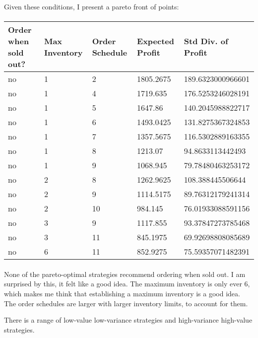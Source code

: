 \documentclass{article}
\begin{document}
Given these conditions, I present a pareto front of points:


\paragraph{}
\begin{tabular}{l|l|l|l|l}
Order when sold out? & Max Inventory & Order Schedule & Expected Profit & Std Div. of Profit \\
\hline
no&1&2&1805.2675&189.6323000966601\\
no&1&4&1719.635&176.5253246028191\\
no&1&5&1647.86&140.2045988822717\\
no&1&6&1493.0425&131.8275367324853\\
no&1&7&1357.5675&116.5302889163355\\
no&1&8&1213.07&94.8633113442493\\
no&1&9&1068.945&79.78480463253172\\
no&2&8&1262.9625&108.388445506644\\
no&2&9&1114.5175&89.76312179241314\\
no&2&10&984.145&76.01933088591156\\
no&3&9&1117.855&93.37847273785468\\
no&3&11&845.1975&69.92698808085689\\
no&6&11&852.9275&75.59357071482391\\
\end{tabular}
\paragraph{}

None of the pareto-optimal strategies recommend ordering when sold out.
I am surprised by this, it felt like a good idea.
The maximum inventory is only ever 6, which makes me think that establishing
	a maximum inventory is a good idea.
The order schedules are larger with larger inventory limits, to account for them.

There is a range of low-value low-variance strategies and high-variance 
	high-value strategies.
\end{document}
